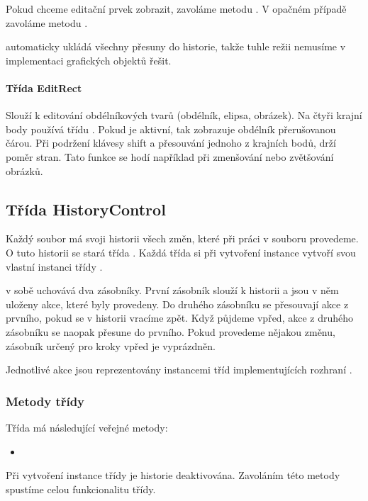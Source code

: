 \documentclass[
  field=inf,
  biblatex=false,
  glossaries,
  index
]{kidiplom}
\begin{document}
Pokud chceme editační prvek zobrazit, zavoláme metodu . V opačném případě zavoláme metodu .

 automaticky ukládá všechny přesuny do historie, takže tuhle režii nemusíme v implementaci grafických objektů řešit.

\paragraph{Třída EditRect}

Slouží k editování obdélníkových tvarů (obdélník, elipsa, obrázek). Na čtyři krajní body používá třídu . Pokud je aktivní, tak zobrazuje obdélník přerušovanou čárou. Při podržení klávesy shift a přesouvání jednoho z krajních bodů, drží poměr stran. Tato funkce se hodí například při zmenšování nebo zvětšování obrázků.

\subsection{Třída HistoryControl}

Každý soubor má svoji historii všech změn, které při práci v souboru provedeme. O tuto historii se stará třída . Každá třída  si při vytvoření instance vytvoří svou vlastní instanci třídy .

 v sobě uchovává dva zásobníky. První zásobník slouží k historii a jsou v něm uloženy akce, které byly provedeny. Do druhého zásobníku se přesouvají akce z prvního, pokud se v historii vracíme zpět. Když půjdeme vpřed, akce z druhého zásobníku se naopak přesune do prvního. Pokud provedeme nějakou změnu, zásobník určený pro kroky vpřed je vyprázdněn.

Jednotlivé akce jsou reprezentovány instancemi tříd implementujících rozhraní .

\subsubsection{Metody třídy}

Třída  má následující veřejné metody:

\begin{itemize}
\item {}
\end{itemize}
Při vytvoření instance třídy  je historie deaktivována. Zavoláním této metody spustíme celou funkcionalitu třídy.
\end{document}
